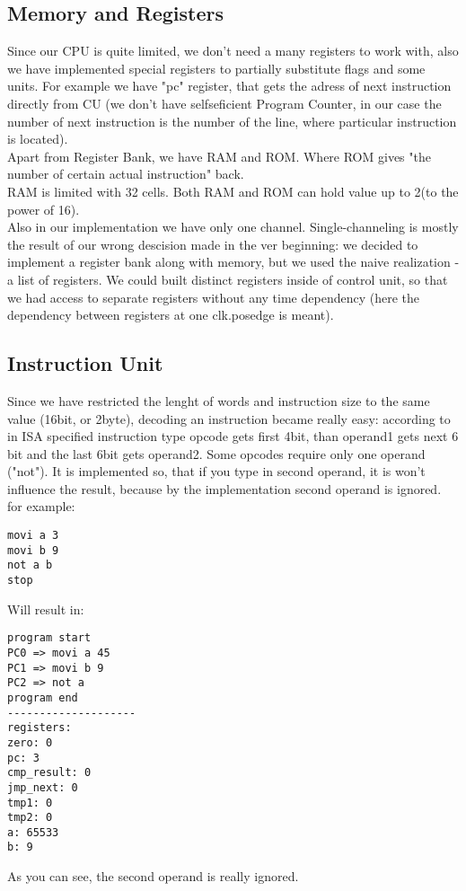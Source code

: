 \documentclass[11pt,a4paper]{article}
\begin{document}
\subsection{Memory and Registers}
Since our CPU is quite limited, we don't need a many registers to work with, also we have implemented special registers to partially substitute flags and some units. For example we have "pc" register, that gets the adress of next instruction directly from CU (we don't have selfseficient Program Counter, in our case the number of next instruction is the number of the line, where particular instruction is located).\\
Apart from Register Bank, we have RAM and ROM. Where ROM gives "the number of certain actual instruction" back.\\
RAM is limited with 32 cells. Both RAM and ROM can hold value up to 2(to the power of 16). \\
Also in our implementation we have only one channel.
Single-channeling is mostly the result of our wrong descision made in the ver beginning: we decided to implement a register bank along with memory, but we used the naive realization - a list of registers. We could built distinct registers inside of control unit, so that we had access to separate registers without any time dependency (here the dependency between registers at one clk.posedge is meant).\\

\subsection{Instruction Unit}
Since we have restricted the lenght of words and instruction size to the same value (16bit, or 2byte), decoding an instruction became really easy:
according to in ISA specified instruction type opcode gets first 4bit, than operand1 gets next 6 bit and the last 6bit gets operand2. Some opcodes require only one operand ("not"). It is implemented so, that if you type in second operand, it is won't influence the result, because by the implementation second operand is ignored.
for example:
\begin{verbatim}
movi a 3
movi b 9
not a b
stop
\end{verbatim}
Will result in:
\begin{verbatim}
program start
PC0 => movi a 45
PC1 => movi b 9
PC2 => not a
program end
--------------------
registers:
zero: 0
pc: 3
cmp_result: 0
jmp_next: 0
tmp1: 0
tmp2: 0
a: 65533
b: 9
\end{verbatim}
As you can see, the second operand is really ignored.\\
\end{document}
